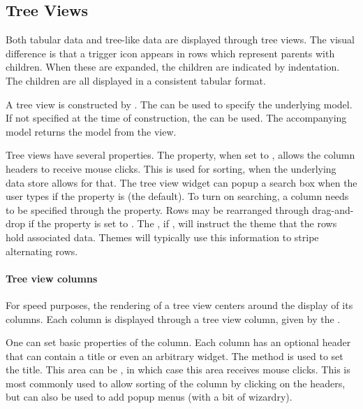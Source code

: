 \subsection{Tree Views}
\label{sec:RGtk2-tree-view}

Both tabular data and tree-like data are displayed through tree
views. The visual difference is that a trigger icon appears in rows which
represent parents with children. When these are expanded, the
children are indicated by indentation. The children are all displayed
in a consistent tabular format.

A tree view is constructed by . The
 can be used to specify the underlying
model. If not specified at the time of construction, the
 can be used. The accompanying
 model returns the model from the view.

Tree views have several properties. The 
property, when set to , allows the column headers to
receive mouse clicks. This is used for sorting, when the underlying
data store allows for that. The tree view widget can popup a search
box when the user types  if the property
 is  (the default). To turn on
searching, a column needs to be specified through the
 property. Rows may be rearranged through
drag-and-drop if the  property is set to
. The , if , will instruct the
theme that the rows hold associated data. Themes will typically use this
information to stripe alternating rows.


\paragraph{Tree view columns}
For speed purposes, the rendering of a tree view centers around the
display of its columns. Each column is displayed through a tree view
column, given by the .

One can set basic properties of the column. Each column has an
optional header that can contain a title or even an arbitrary
widget. The  method is used to set
the title. This area can be , in which case this area
receives mouse clicks. This is most commonly used to allow sorting of
the column by clicking on the headers, but can also be used to add
popup menus (with a bit of wizardry).

